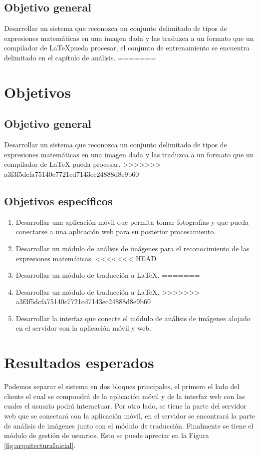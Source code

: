 \subsection{Objetivo general}
Desarrollar un sistema que reconozca un conjunto delimitado de tipos de expresiones matemáticas en una imagen dada y las traduzca a un formato que un compilador de \LaTeX pueda procesar, el conjunto de entrenamiento se encuentra delimitado en el capítulo de análisis.
=======

\section{Objetivos}
\subsection{Objetivo general}
Desarrollar un sistema que reconozca un conjunto delimitado de tipos de expresiones matemáticas en una imagen dada y las traduzca a un formato que un compilador de \LaTeX{} pueda procesar.
>>>>>>> a3f3f5dcfa75140c7721cd7143ec24888d8e9b60
\subsection{Objetivos específicos}
\begin{enumerate}
	\item Desarrollar una aplicación móvil que permita tomar fotografías y que pueda conectarse a una aplicación web para su posterior procesamiento.
	\item Desarrollar un módulo de análisis de imágenes para el reconocimiento de las expresiones matemáticas.
<<<<<<< HEAD
	\item Desarrollar un módulo de traducción a \LaTeX.
=======
	\item Desarrollar un módulo de traducción a \LaTeX{}.
>>>>>>> a3f3f5dcfa75140c7721cd7143ec24888d8e9b60
	\item Desarrollar la interfaz que conecte el módulo de análisis de imágenes alojado en el servidor con la aplicación móvil y web.
\end{enumerate}


\section{Resultados esperados}
Podemos separar el sistema en dos bloques principales, el primero el lado del cliente el cual se compondrá de la aplicación móvil y de la interfaz web con las cuales el usuario podrá interactuar. Por otro lado, se tiene la parte del servidor web que se conectará con la aplicación móvil, en el servidor se encontrará la parte de análisis de imágenes junto con el módulo de traducción. Finalmente se tiene el módulo de gestión de usuarios. Esto se puede apreciar en la Figura \ref{fig:arquitecturaInicial}.%


